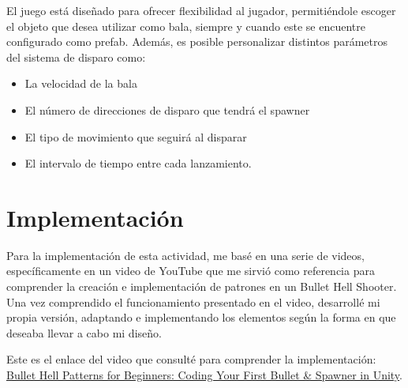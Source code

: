 \documentclass[11pt]{article}
\begin{document}
\vspace{0.5cm} 

El juego está diseñado para ofrecer flexibilidad al jugador, permitiéndole escoger el objeto que desea utilizar como bala, siempre y cuando este se encuentre configurado como prefab. Además, es posible personalizar distintos parámetros del sistema de disparo como:

\begin{itemize}
\item La velocidad de la bala
\item El número de direcciones de disparo que tendrá el spawner
\item El tipo de movimiento que seguirá al disparar 
\item El intervalo de tiempo entre cada lanzamiento.
\end{itemize}

\section*{Implementación}

  Para la implementación de esta actividad, me basé en una serie de videos, específicamente en un video de YouTube que me sirvió como referencia para comprender la creación e implementación de patrones en un Bullet Hell Shooter. Una vez comprendido el funcionamiento presentado en el video, desarrollé mi propia versión, adaptando e implementando los elementos según la forma en que deseaba llevar a cabo mi diseño.

  \vspace{0.5cm}

  Este es el enlace del video que consulté para comprender la implementación: 
  \href{https://www.youtube.com/watch?v=YNJM7rWbbxY}{Bullet Hell Patterns for Beginners: Coding Your First Bullet \& Spawner in Unity}.
\end{document}
